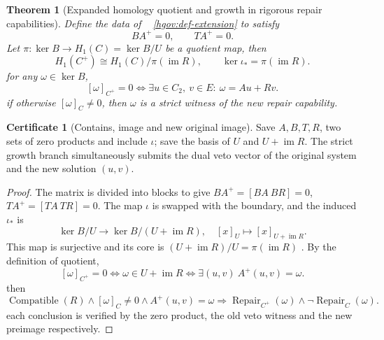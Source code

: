 \documentclass[12pt,a4paper,openany,notitlepage]{report}
\theoremstyle{plain}
\newtheorem{theorem}{Theorem}[chapter]
\theoremstyle{definition}
\newtheorem*{certificate}{Certificate}
\theoremstyle{remark}
\begin{document}
\begin{CJK*}
\begin{theorem}
[Expanded homology quotient and growth in rigorous repair capabilities]\label{hgov:thm-extension}
Define the data of ~ \ref{hgov:def-extension} to satisfy \[
 BA^+=0,\qquad TA^+=0.
\] Let $\pi:\ker B\to H_1(C)=\ker B/U$ be a quotient map, then \[
 H_1(C^+)\cong
 H_1(C)\big/\pi(\operatorname{im}R),
 \qquad
 \ker\iota_*=\pi(\operatorname{im}R).
\] for any $\omega\in\ker B$, \[
 [\omega]_{C^+}=0
 \Longleftrightarrow
 \exists u\in C_2,\ v\in E:\ \omega=Au+Rv.
\] if otherwise $[\omega]_C\ne0$, then $\omega$ is a strict witness of the new repair capability.\end{theorem}
\begin{certificate}
[Contains, image and new original image]Save $A,B,T,R$, two sets of zero products and include $\iota$; save the basis of $U$ and $U+\operatorname{im}R$. The strict growth branch simultaneously submits the dual veto vector of the original system and the new solution $(u,v)$.\end{certificate}
\begin{proof}
The matrix is divided into blocks to give $BA^+=[BA\ BR]=0$, $TA^+=[TA\ TR]=0$. The map $\iota$ is swapped with the boundary, and the induced $\iota_*$ is \[
 \ker B/U\longrightarrow\ker B/(U+\operatorname{im}R),
 \quad [x]_U\longmapsto[x]_{U+\operatorname{im}R}.
\] This map is surjective and its core is $(U+\operatorname{im}R)/U=\pi(\operatorname{im}R)$ . By the definition of quotient, \[
 [\omega]_{C^+}=0
 \Longleftrightarrow
 \omega\in U+\operatorname{im}R
 \Longleftrightarrow
 \exists(u,v)\ A^+(u,v)=\omega.
\] then \[
 \operatorname{Compatible}(R)
 \wedge[\omega]_C\ne0
 \wedge A^+(u,v)=\omega
 \Longrightarrow
 \operatorname{Repair}_{C^+}(\omega)
 \wedge\neg\operatorname{Repair}_{C}(\omega).
\] each conclusion is verified by the zero product, the old veto witness and the new preimage respectively.\end{proof}



\end{CJK*}
\end{document}
